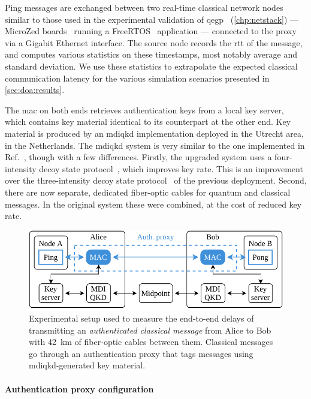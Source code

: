 Ping messages are exchanged between two real-time classical network nodes similar to those used in
the experimental validation of \acrshort{qegp}~\cite{pompili_2022_experimental}
(\cref{chp:netstack}) --- MicroZed boards~\cite{microzed} running a FreeRTOS~\cite{freertos}
application --- connected to the proxy via a Gigabit Ethernet interface. The source node records the
\acrshort{rtt} of the message, and computes various statistics on these timestamps, most notably
average and standard deviation. We use these statistics to extrapolate the expected classical
communication latency for the various simulation scenarios presented in \cref{sec:doa:results}.

The \acrfull{mac} on both ends retrieves authentication keys from a local key server, which contains
key material identical to its counterpart at the other end. Key material is produced by an
\acrshort{mdiqkd} implementation deployed in the Utrecht area, in the Netherlands. The
\acrshort{mdiqkd} system is very similar to the one implemented in
Ref.~\cite{berrevoets_2022_deployed}, though with a few differences. Firstly, the upgraded system
uses a four-intensity decoy state protocol~\cite{zhou_2016_making, woodward_2021_gigahertz}, which
improves key rate. This is an improvement over the three-intensity decoy state
protocol~\cite{yu_2013_three} of the previous deployment. Second, there are now separate, dedicated
fiber-optic cables for quantum and classical messages. In the original system these were combined,
at the cost of reduced key rate.

\begin{figure}[t]
    \centering
    \includegraphics[width=0.6\linewidth]{figures/mac-setup-diagram.pdf}
    \caption{
        Experimental setup used to measure the end-to-end delays of transmitting an
        \emph{authenticated classical message} from Alice to Bob with \qty{42}{\km} of fiber-optic
        cables between them. Classical messages go through an authentication proxy that tags
        messages using \acrshort{mdiqkd}-generated key material.
    }
    \label{fig:mac-setup-diagram}
\end{figure}

\paragraph{Authentication proxy configuration}

